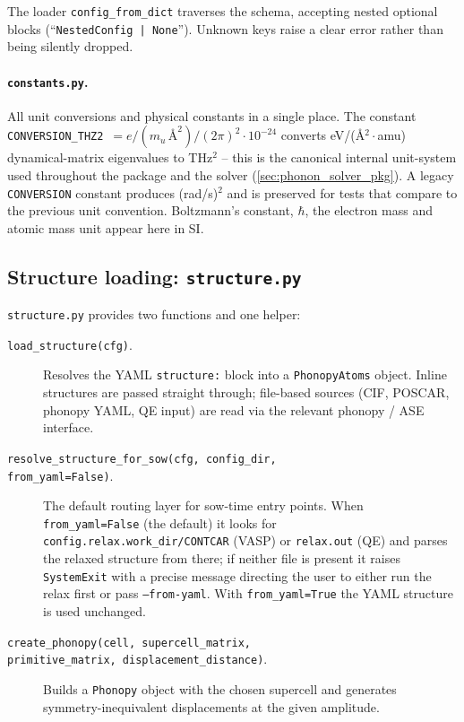 The loader \texttt{config\_from\_dict} traverses the schema, accepting
nested optional blocks (``\texttt{NestedConfig | None}'').  Unknown
keys raise a clear error rather than being silently dropped.

\paragraph{\texttt{constants.py}.}  All unit conversions and physical
constants in a single place.  The constant
\texttt{CONVERSION\_THZ2}~$= e/(m_u\,\text{\AA}^2)/(2\pi)^2\cdot 10^{-24}$ converts
eV/(\AA$^2\cdot$amu) dynamical-matrix eigenvalues to THz$^2$ -- this
is the canonical internal unit-system used throughout the package and
the solver (\cref{sec:phonon_solver_pkg}).  A legacy \texttt{CONVERSION}
constant produces (rad/s)$^2$ and is preserved for tests that compare
to the previous unit convention.  Boltzmann's constant, $\hbar$, the
electron mass and atomic mass unit appear here in SI.

\subsection{Structure loading: \texttt{structure.py}}
\label{sec:pinputs_structure}

\texttt{structure.py} provides two functions and one helper:

\begin{description}
  \item[\texttt{load\_structure(cfg)}.]  Resolves the YAML
        \texttt{structure:} block into a \texttt{PhonopyAtoms} object.
        Inline structures are passed straight through; file-based
        sources (CIF, POSCAR, phonopy YAML, QE input) are read via the
        relevant phonopy / ASE interface.
  \item[\texttt{resolve\_structure\_for\_sow(cfg, config\_dir, \\
        from\_yaml=False)}.]  The default routing layer for sow-time
        entry points.  When \texttt{from\_yaml=False} (the default) it
        looks for \texttt{config.relax.work\_dir/CONTCAR} (VASP) or
        \texttt{relax.out} (QE) and parses the relaxed structure from
        there; if neither file is present it raises \texttt{SystemExit}
        with a precise message directing the user to either run the
        relax first or pass \texttt{--from-yaml}.  With
        \texttt{from\_yaml=True} the YAML structure is used unchanged.
  \item[\texttt{create\_phonopy(cell, supercell\_matrix,\\
        primitive\_matrix, displacement\_distance)}.]  Builds a
        \texttt{Phonopy} object with the chosen supercell and generates
        symmetry-inequivalent displacements at the given amplitude.
\end{description}

